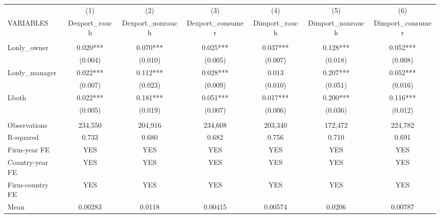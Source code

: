 \begin{tabular}{lcccccc} \hline
 & (1) & (2) & (3) & (4) & (5) & (6) \\
VARIABLES & Dexport\_rauch & Dexport\_nonrauch & Dexport\_consumer & Dimport\_rauch & Dimport\_nonrauch & Dimport\_consumer \\ \hline
 &  &  &  &  &  &  \\
Lonly\_owner & 0.020*** & 0.070*** & 0.025*** & 0.037*** & 0.128*** & 0.052*** \\
 & (0.004) & (0.010) & (0.005) & (0.007) & (0.018) & (0.008) \\
Lonly\_manager & 0.022*** & 0.112*** & 0.028*** & 0.013 & 0.207*** & 0.052*** \\
 & (0.007) & (0.023) & (0.009) & (0.010) & (0.051) & (0.016) \\
Lboth & 0.022*** & 0.181*** & 0.051*** & 0.017*** & 0.200*** & 0.116*** \\
 & (0.005) & (0.019) & (0.007) & (0.006) & (0.036) & (0.012) \\
 &  &  &  &  &  &  \\
Observations & 234,550 & 204,916 & 234,608 & 203,340 & 172,472 & 224,782 \\
R-squared & 0.733 & 0.680 & 0.682 & 0.756 & 0.710 & 0.691 \\
Firm-year FE & YES & YES & YES & YES & YES & YES \\
Country-year FE & YES & YES & YES & YES & YES & YES \\
Firm-country FE & YES & YES & YES & YES & YES & YES \\
 Mean & 0.00283 & 0.0118 & 0.00415 & 0.00574 & 0.0206 & 0.00787 \\ \hline
\end{tabular}
